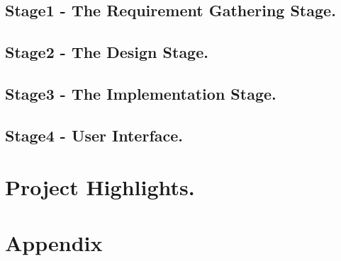 \documentclass[10pt,conference]{IEEEtran}
\begin{document}

%
\subsection{Stage1 - The Requirement Gathering Stage. }\label{sec:1 Requirement Gathering Stage. }


\subsection{Stage2 - The Design Stage. }\label{sec: 2:The Design Stage.}


\subsection{Stage3 - The Implementation Stage. }\label{sec: 3 The Implementation Stage.}


\subsection{Stage4 -	User Interface. }\label{sec: 4. User Interface.}


\section{Project Highlights.}\label{sec:7. Project Highlights.}

\section{Appendix}\label{sec:Appendix}

%



%
%
\end{document}
